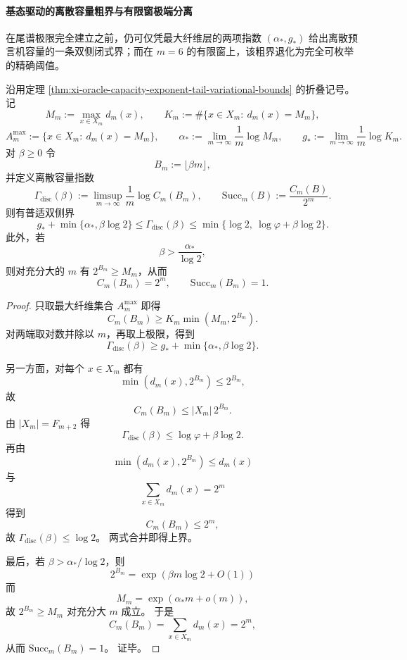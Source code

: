 \paragraph{基态驱动的离散容量粗界与有限窗极端分离}
在尾谱极限完全建立之前，仍可仅凭最大纤维层的两项指数 \((\alpha_*,g_*)\) 给出离散预言机容量的一条双侧闭式界；而在 \(m=6\) 的有限窗上，该粗界退化为完全可枚举的精确阈值。

\begin{theorem}[线性比特率下离散预言机容量的基态驱动双侧界]\label{thm:xi-oracle-capacity-exponent-groundstate-two-sided-bounds}
沿用定理 \ref{thm:xi-oracle-capacity-exponent-tail-variational-bounds} 的折叠记号。
记
\[
M_m:=\max_{x\in X_m}d_m(x),\qquad
K_m:=\#\{x\in X_m:\ d_m(x)=M_m\},
\]
\[
A_m^{\max}:=\{x\in X_m:\ d_m(x)=M_m\},
\qquad
\alpha_*:=\lim_{m\to\infty}\frac{1}{m}\log M_m,\qquad
g_*:=\lim_{m\to\infty}\frac{1}{m}\log K_m.
\]
对 \(\beta\ge 0\) 令
\[
B_m:=\lfloor \beta m\rfloor,
\]
并定义离散容量指数
\[
\Gamma_{\mathrm{disc}}(\beta):=\limsup_{m\to\infty}\frac1m\log C_m(B_m),
\qquad
\mathrm{Succ}_m(B):=\frac{C_m(B)}{2^m}.
\]
则有普适双侧界
\[
\boxed{\;
g_*+\min\{\alpha_*,\beta\log 2\}
\le
\Gamma_{\mathrm{disc}}(\beta)
\le
\min\{\log 2,\ \log\varphi+\beta\log 2\}.\;}
\]
此外，若
\[
\beta>\frac{\alpha_*}{\log 2},
\]
则对充分大的 \(m\) 有 \(2^{B_m}\ge M_m\)，从而
\[
C_m(B_m)=2^m,\qquad \mathrm{Succ}_m(B_m)=1.
\]
\end{theorem}
\begin{proof}
只取最大纤维集合 \(A_m^{\max}\) 即得
\[
C_m(B_m)\ge K_m\min(M_m,2^{B_m}).
\]
对两端取对数并除以 \(m\)，再取上极限，得到
\[
\Gamma_{\mathrm{disc}}(\beta)\ge g_*+\min\{\alpha_*,\beta\log 2\}.
\]

另一方面，对每个 \(x\in X_m\) 都有
\[
\min(d_m(x),2^{B_m})\le 2^{B_m},
\]
故
\[
C_m(B_m)\le |X_m|\,2^{B_m}.
\]
由 \(|X_m|=F_{m+2}\) 得
\[
\Gamma_{\mathrm{disc}}(\beta)\le \log\varphi+\beta\log 2.
\]
再由
\[
\min(d_m(x),2^{B_m})\le d_m(x)
\]
与
\[
\sum_{x\in X_m}d_m(x)=2^m
\]
得到
\[
C_m(B_m)\le 2^m,
\]
故 \(\Gamma_{\mathrm{disc}}(\beta)\le \log 2\)。
两式合并即得上界。

最后，若 \(\beta>\alpha_*/\log 2\)，则
\[
2^{B_m}=\exp(\beta m\log 2+O(1))
\]
而
\[
M_m=\exp(\alpha_*m+o(m)),
\]
故 \(2^{B_m}\ge M_m\) 对充分大 \(m\) 成立。
于是
\[
C_m(B_m)=\sum_{x\in X_m}d_m(x)=2^m,
\]
从而 \(\mathrm{Succ}_m(B_m)=1\)。
证毕。
\end{proof}

